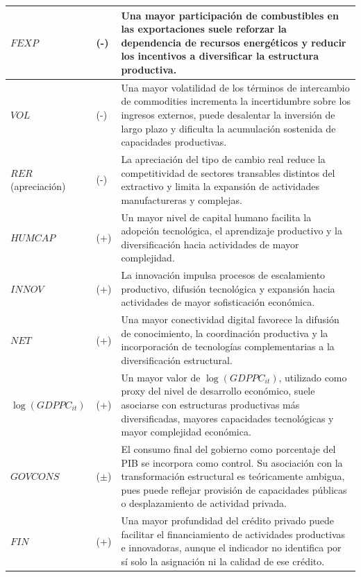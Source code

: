 \documentclass[../../TFM.tex]{subfiles}
\begin{document}
\begin{longtable}{|
			>{\raggedright\arraybackslash}p{}|
			>{\centering\arraybackslash}p{}|
			>{\raggedright\arraybackslash}p{}|}
		$FEXP$
		& (-)
		& Una mayor participación de combustibles en las exportaciones suele reforzar la dependencia de recursos energéticos y reducir los incentivos a diversificar la estructura productiva.
		\\
		\hline

		$VOL$
		& (-)
		& Una mayor volatilidad de los términos de intercambio de commodities incrementa la incertidumbre sobre los ingresos externos, puede desalentar la inversión de largo plazo y dificulta la acumulación sostenida de capacidades productivas. \\
		\hline

		$RER$ (apreciación)
		& (-)
		& La apreciación del tipo de cambio real reduce la competitividad de sectores transables distintos del extractivo y limita la expansión de actividades manufactureras y complejas. \\
		\hline

		$HUMCAP$
		& (+)
		& Un mayor nivel de capital humano facilita la adopción tecnológica, el aprendizaje productivo y la diversificación hacia actividades de mayor complejidad. \\
		\hline

		$INNOV$
		& (+)
		& La innovación impulsa procesos de escalamiento productivo, difusión tecnológica y expansión hacia actividades de mayor sofisticación económica. \\
		\hline

		$NET$
		& (+)
		& Una mayor conectividad digital favorece la difusión de conocimiento, la coordinación productiva y la incorporación de tecnologías complementarias a la diversificación estructural.
		\\
		\hline

		$\log(GDPPC_{it})$
		& (+)
		& Un mayor valor de $\log(GDPPC_{it})$, utilizado como proxy del nivel de desarrollo económico, suele asociarse con estructuras productivas más diversificadas, mayores capacidades tecnológicas y mayor complejidad económica. \\
		\hline

		$GOVCONS$
		& ($\pm$)
		& El consumo final del gobierno como porcentaje del PIB se incorpora como control. Su asociación con la transformación estructural es teóricamente ambigua, pues puede reflejar provisión de capacidades públicas o desplazamiento de actividad privada. \\
		\hline

		$FIN$
		& (+)
		& Una mayor profundidad del crédito privado puede facilitar el financiamiento de actividades productivas e innovadoras, aunque el indicador no identifica por sí solo la asignación ni la calidad de ese crédito. \\
		\hline

	\end{longtable}
	\normalsize
\end{document}
